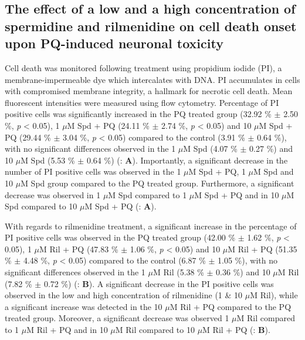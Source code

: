 \subsection{The effect of a low and a high concentration of spermidine and rilmenidine on cell death onset upon PQ-induced neuronal toxicity} 
Cell death was monitored following treatment using propidium iodide (PI), a membrane-impermeable dye which intercalates with DNA. PI accumulates in cells with compromised membrane integrity, a hallmark for necrotic cell death. Mean fluorescent intensities were measured using flow cytometry. Percentage of PI positive cells was significantly increased in the PQ treated group (32.92 \% $\pm$ 2.50 \%, \textit{p} < 0.05), 1 $\mu$M Spd + PQ (24.11 \% $\pm$ 2.74 \%, \textit{p} < 0.05) and 10 $\mu$M Spd + PQ (29.44 \% $\pm$ 3.04 \%, \textit{p} < 0.05) compared to the control (3.91 \% $\pm$ 0.64 \%), with no significant differences observed in the 1 $\mu$M Spd (4.07 \% $\pm$ 0.27 \%) and 10 $\mu$M Spd (5.53 \% $\pm$ 0.64 \%) (: \textbf{A}). Importantly, a significant decrease in the number of PI positive cells was observed in the 1 $\mu$M Spd + PQ, 1 $\mu$M Spd and 10 $\mu$M Spd group compared to the PQ treated group. Furthermore, a significant decrease was observed in 1 $\mu$M Spd compared to 1 $\mu$M Spd + PQ and in 10 $\mu$M Spd compared to 10 $\mu$M Spd + PQ (: \textbf{A}).

With regards to rilmenidine treatment, a significant increase in the percentage of PI positive cells was observed in the PQ treated group (42.00 \% $\pm$ 1.62 \%, \textit{p} < 0.05), 1 $\mu$M Ril + PQ (47.83 \% $\pm$ 1.06 \%, \textit{p} < 0.05) and 10 $\mu$M Ril + PQ (51.35 \% $\pm$ 4.48 \%, \textit{p} < 0.05) compared to the control (6.87 \% $\pm$ 1.05 \%), with no significant differences observed in the 1 $\mu$M Ril (5.38 \% $\pm$ 0.36 \%) and 10 $\mu$M Ril (7.82 \% $\pm$ 0.72 \%) (: \textbf{B}). A significant decrease in the PI positive cells was observed in the low and high concentration of rilmenidine (1 \& 10 $\mu$M Ril), while a significant increase was detected in the 10 $\mu$M Ril + PQ compared to the PQ treated group.  Moreover, a significant decrease was observed 1 $\mu$M Ril compared to 1 $\mu$M Ril + PQ and in 10 $\mu$M Ril compared to 10 $\mu$M Ril + PQ (: \textbf{B}).


